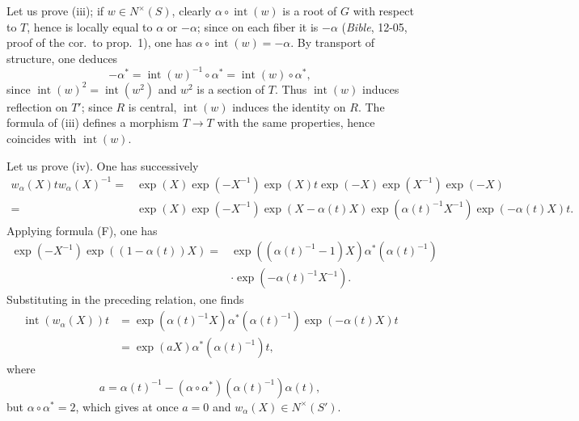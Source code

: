 Let us prove (iii); if $w\in N^\times(S)$, clearly $\alpha\circ\operatorname{int}(w)$ is a root of $G$ with respect to $T$, hence is locally equal to $\alpha$ or $-\alpha$; since on each fiber it is $-\alpha$ (\textit{Bible}, 12-05, proof of the cor.~to prop.~1), one has $\alpha\circ\operatorname{int}(w)=-\alpha$. By transport of structure, one deduces
\[
-\alpha^*=\operatorname{int}(w)^{-1}\circ\alpha^*=\operatorname{int}(w)\circ\alpha^*,
\]
since $\operatorname{int}(w)^2=\operatorname{int}(w^2)$ and $w^2$ is a section of $T$. Thus $\operatorname{int}(w)$ induces reflection on $T'$; since $R$ is central, $\operatorname{int}(w)$ induces the identity on $R$. The formula of (iii) defines a morphism $T\to T$ with the same properties, hence coincides with $\operatorname{int}(w)$.

Let us prove (iv). One has successively
\[
\begin{split}
w_\alpha(X)tw_\alpha(X)^{-1}={}&\exp(X)\exp(-X^{-1})\exp(X)t\exp(-X)\exp(X^{-1})\exp(-X)\\
={}&\exp(X)\exp(-X^{-1})\exp(X-\alpha(t)X)\exp(\alpha(t)^{-1}X^{-1})\exp(-\alpha(t)X)t.
\end{split}
\]
Applying formula (F), one has
\[
\begin{split}
\exp(-X^{-1})\exp((1-\alpha(t))X)={}&\exp((\alpha(t)^{-1}-1)X)\alpha^*(\alpha(t)^{-1})\\
&\cdot\exp(-\alpha(t)^{-1}X^{-1}).
\end{split}
\]
Substituting in the preceding relation, one finds
\[
\begin{aligned}
\operatorname{int}(w_\alpha(X))t&=\exp(\alpha(t)^{-1}X)\alpha^*(\alpha(t)^{-1})\exp(-\alpha(t)X)t\\
&=\exp(aX)\alpha^*(\alpha(t)^{-1})t,
\end{aligned}
\]
where
\[
a=\alpha(t)^{-1}-(\alpha\circ\alpha^*)(\alpha(t)^{-1})\alpha(t),
\]
but $\alpha\circ\alpha^*=2$, which gives at once $a=0$ and $w_\alpha(X)\in N^\times(S')$.

